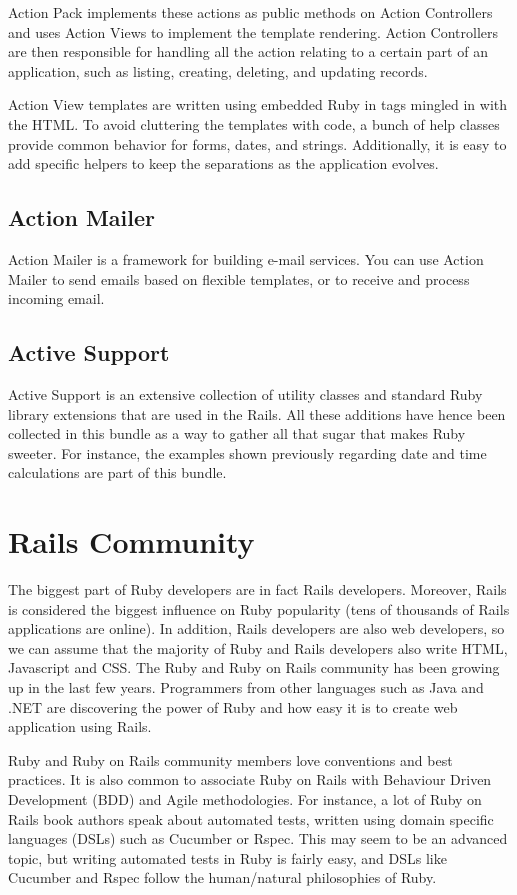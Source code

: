 Action Pack implements these actions as public methods on Action Controllers and uses Action Views to implement the template rendering. Action Controllers are then responsible for handling all the action relating to a certain part of an application, 
such as listing, creating, deleting, and updating records.

Action View templates are written using embedded Ruby in tags mingled in with the HTML. 
To avoid cluttering the templates with code, a bunch of help classes provide common behavior for forms, dates, and strings. 
Additionally, it is easy to add specific helpers to keep the separations as the application evolves.


\subsection{Action Mailer}  
Action Mailer is a framework for building e-mail services. You can use Action Mailer to send emails based on flexible templates, or to receive and process incoming email.


\subsection{Active Support} 
Active Support is an extensive collection of utility classes and standard Ruby library extensions that are used in the Rails. 
All these additions have hence been collected in this bundle as a way to gather all that sugar that makes Ruby sweeter. 
For instance, the examples shown previously regarding date and time calculations are part of this bundle.


\section{Rails Community} 
The biggest part of Ruby developers are in fact Rails developers. 
Moreover, Rails is considered the biggest influence on Ruby popularity
(tens of thousands of Rails applications are online).
In addition, Rails developers are also web developers, 
so we can assume that the majority of Ruby and Rails developers also write HTML, Javascript and CSS.
The Ruby and Ruby on Rails community has been growing up in the last few years. 
Programmers from other languages such as Java and .NET are discovering the power of Ruby and how easy it is 
to create web application using Rails.

Ruby and Ruby on Rails community members love conventions and best practices.
It is also common to associate Ruby on Rails with Behaviour Driven Development (BDD) and Agile methodologies.
For instance, a lot of Ruby on Rails book authors speak about automated tests, 
written using domain specific languages (DSLs) such as Cucumber or Rspec. 
This may seem to be an advanced topic, but writing automated tests in Ruby is fairly easy,
and DSLs like Cucumber and Rspec follow the human/natural philosophies of Ruby.

